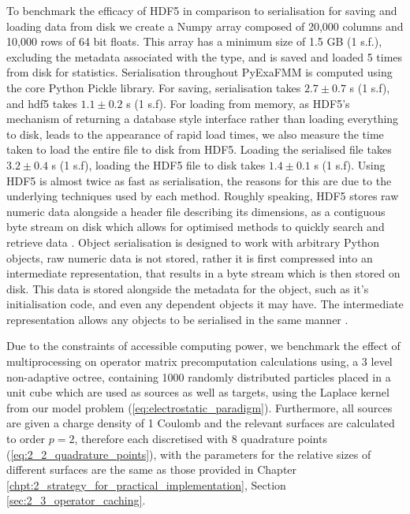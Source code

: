 To benchmark the efficacy of HDF5 in comparison to serialisation for saving
and loading data from disk we create a Numpy array composed of
20,000 columns and 10,000 rows of 64 bit floats. This array has a minimum size
of 1.5 GB (1 s.f.), excluding the metadata associated with the type, and is
saved and loaded 5 times from disk for statistics. Serialisation throughout
\gls{PyExaFMM} is computed using the core Python Pickle library. For saving,
serialisation takes $2.7 \pm 0.7$ s (1 s.f), and hdf5 takes $1.1 \pm 0.2$ s (1 s.f).
For loading from memory, as HDF5's mechanism of returning a database style interface
rather than loading everything to disk, leads to the appearance of rapid
load times, we also measure the time taken to load the entire file to disk from
HDF5. Loading the serialised file takes $3.2 \pm 0.4$ s (1 s.f), loading
the HDF5 file to disk takes $1.4 \pm 0.1$ s (1 s.f). Using HDF5 is almost
twice as fast as serialisation, the reasons for this are due to the underlying
techniques used by each method. Roughly speaking, HDF5 stores raw numeric data
alongside a header file describing its dimensions, as a contiguous byte stream
on disk which allows for optimised methods to quickly search and retrieve data
\cite{collette2013python}. Object serialisation is designed to work with arbitrary
Python objects, raw numeric data is not stored, rather it is first compressed
into an intermediate representation, that results in a byte stream which is then
stored on disk. This data is stored alongside the metadata for the object, such
as it's initialisation code, and even any dependent objects it may have. The
intermediate representation allows any objects to be serialised in the same
manner \cite{pickle}.

Due to the constraints of accessible computing power, we benchmark the effect of
multiprocessing on operator matrix precomputation calculations using, a 3 level
non-adaptive octree, containing 1000 randomly distributed
particles placed in a unit cube which are used as sources as well as targets,
using the Laplace kernel from our model problem (\ref{eq:electrostatic_paradigm}).
Furthermore, all sources are given a charge density of 1 Coulomb and the relevant surfaces
are calculated to order $p=2$, therefore each discretised with $8$ quadrature points
(\ref{eq:2_2_quadrature_points}), with the parameters for the relative sizes
of different surfaces are the same as those provided
in Chapter \ref{chpt:2_strategy_for_practical_implementation},
Section \ref{sec:2_3_operator_caching}.


